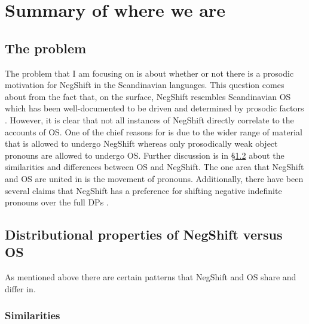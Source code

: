 \documentclass[12pt, letterpaper]{article}
\begin{document}
\section{Summary of where we are} \label{sec:RN}
\subsection{The problem} \label{sec:PROBLEM}

\ea The problem that I am focusing on is about whether or not there is a prosodic motivation for NegShift in the Scandinavian languages. 
\ex This question comes about from the fact that, on the surface, NegShift resembles Scandinavian OS which has been well-documented to be driven and determined by prosodic factors \citep{erteschik-shirSoundPatternsSyntax2005,erteschik-shirScandinavianObjectShift2017,erteschik-shirVariationMainlandScandinavian2020,brinkerhoffMATCHINGPhrasesNorwegian2020}.
\ex However, it is clear that not all instances of NegShift directly correlate to the accounts of OS. One of the chief reasons for is due to the wider range of material that is allowed to undergo NegShift whereas only prosodically weak object pronouns are allowed to undergo OS. Further discussion is in §\ref{sec:DISTRIBUTION} about the similarities and differences between OS and NegShift.
\ex The one area that NegShift and OS are united in is the movement of pronouns. Additionally, there have been several claims that NegShift has a preference for shifting negative indefinite pronouns over the full DPs \citep{christensenInterfacesNegationSyntax2005,penkaNegativeIndefinites2011}. 
\z 

\subsection{Distributional properties of NegShift versus OS} \label{sec:DISTRIBUTION}

\ea As mentioned above there are certain patterns that NegShift and OS share and differ in.
\z

\subsubsection{Similarities} \label{sec:SIM}
\end{document}
